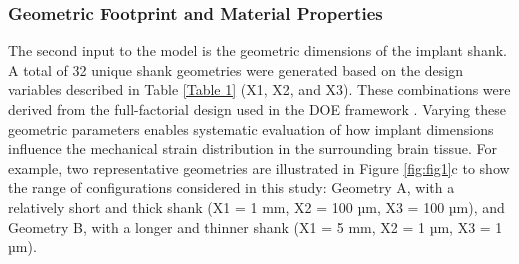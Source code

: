 \documentclass[fleqn,10pt]{wlscirep}
\begin{document}



\subsubsection{Geometric Footprint and Material Properties}
The second input to the model is the geometric dimensions of the implant shank. A total of 32 unique shank geometries were generated based on the design variables described in Table \ref{Table 1} (X1, X2, and X3). These combinations were derived from the full-factorial design used in the DOE framework \cite{Kumar2014, Krishnan2021}. Varying these geometric parameters enables systematic evaluation of how implant dimensions influence the mechanical strain distribution in the surrounding brain tissue. For example, two representative geometries are illustrated in Figure \ref{fig:fig1}c to show the range of configurations considered in this study: Geometry A, with a relatively short and thick shank (X1 = 1 mm, X2 = 100 µm, X3 = 100 µm), and Geometry B, with a longer and thinner shank (X1 = 5 mm, X2 = 1 µm, X3 = 1 µm).
\end{document}
